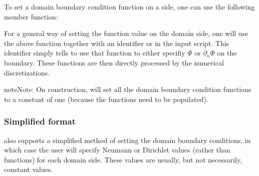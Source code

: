 \documentclass[letterpaper,10pt,english]{sphinxmanual}
\begin{document}
\begin{sphinxVerbatim}[commandchars=\\\{\},formatcom=\scriptsize]
      
\end{sphinxVerbatim}

To set a domain boundary condition function on a side, one can use the following member function:

\begin{sphinxVerbatim}[commandchars=\\\{\},formatcom=\scriptsize]
   
                                            
                                                
\end{sphinxVerbatim}

For a general way of setting the function value on the domain side, one will use the above function together with an identifier  or  in the input script.
This identifier simply tells  to use that function to either specifiy \(\Phi\) or \(\partial_n\Phi\) on the boundary.
These functions are then directly processed by the numerical discretizations.

\begin{sphinxadmonition}{note}{Note:}
On construction,  will set all the domain boundary condition functions to a constant of one (because the functions need to be populated).
\end{sphinxadmonition}


\subsubsection{Simplified format}
\label{\detokenize{Solvers/Electrostatics:simplified-format}}
 also supports a simplified method of setting the domain boundary conditions, in which case the user will specify Neumann or Dirichlet values (rather than functions) for each domain side.
These values are usually, but not necessarily, constant values.
\end{document}
